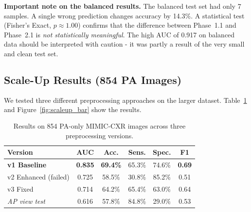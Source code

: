 \documentclass{article}
\begin{document}
\textbf{Important note on the balanced results.}
The balanced test set had only 7 samples. A single wrong prediction changes
accuracy by 14.3\%. A statistical test (Fisher's Exact, $p \approx 1.00$)
confirms that the difference between Phase~1.1 and Phase~2.1 is
\emph{not statistically meaningful}. The high AUC of 0.917 on balanced data
should be interpreted with caution - it was partly a result of the
very small and clean test set.

\subsection{Scale-Up Results (854 PA Images)}

We tested three different preprocessing approaches on the larger dataset.
Table~\ref{tab:scaleup} and Figure~\ref{fig:scaleup_bar} show the results.

\begin{table}[h]
\centering\small
\caption{Results on 854 PA-only MIMIC-CXR images across three preprocessing
versions.}
\label{tab:scaleup}
\begin{tabular}{lccccc}
\toprule
\textbf{Version} & \textbf{AUC} & \textbf{Acc.} & \textbf{Sens.} &
\textbf{Spec.} & \textbf{F1}\\
\midrule
\textbf{v1 Baseline}    & \textbf{0.835} & \textbf{69.4\%} & 65.3\% & 74.6\% & \textbf{0.69} \\
v2 Enhanced (failed)    & 0.725 & 58.5\% & 30.8\% & 85.2\% & 0.51 \\
v3 Fixed                & 0.714 & 64.2\% & 65.4\% & 63.0\% & 0.64 \\
\midrule
\textit{AP view test}   & 0.616 & 57.8\% & 84.8\% & 29.0\% & 0.53 \\
\bottomrule
\end{tabular}
\end{table}
\end{document}
